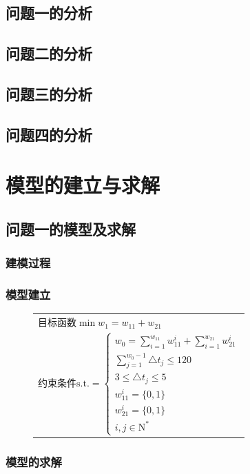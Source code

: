 \documentclass{ctexart}
\begin{document}
{	\subsection{问题一的分析}
	\subsection{问题二的分析}
	\subsection{问题三的分析}
	\subsection{问题四的分析}\thispagestyle{plain}
	\section{模型的建立与求解}
	\subsection{问题一的模型及求解}
	\subsubsection{建模过程}
	\subsubsection{模型建立}
	
	
	\begin{figure}\centering
		\begin{tabular}[]{l}
			目标函数$\min w_1=w_{11}+w_{21}$\\
			约束条件$\mathrm{s.t.}=
			\begin{cases}
			w_0=\sum_{i=1}^{w_{11}}w_{11}^i+\sum_{i=1}^{w_{21}}w_{21}^i\\
			\sum_{j=1}^{w_0-1}\triangle t_j\leqslant120\\
			3\leqslant\triangle t_j\leqslant5\\
			w_{11}^i=\{0,1\}\\
			w_{21}^i=\{0,1\}\\
			i,j\in\mathrm{N^*}
			\end{cases}
			$
		\end{tabular}
	\end{figure}
	\subsubsection{模型的求解}
}
\end{document}
